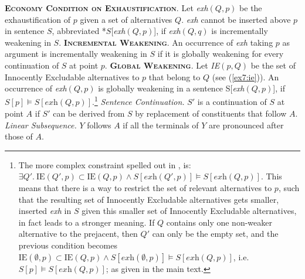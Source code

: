 \begin{exe}
	\ex\label{ex7:economy} {\textsc{\textbf{Economy Condition on Exhaustification}}. Let \textit{exh}$(Q, p)$ be the exhaustification of $p$ given a set of alternatives $Q$. \textit{exh} cannot be inserted above $p$ in sentence $S$, abbreviated *$S$[\textit{exh}$(Q, p)$], if \textit{exh}$(Q, q)$ is incrementally weakening in $S$.}
	\ex\label{ex7:economy-incr-wk} {\textsc{\textbf{Incremental Weakening}}. An occurrence of \textit{exh} taking $p$ as argument is incrementally weakening in $S$ if it is globally weakening for every continuation of $S$ at point $p$.}
	\ex\label{ex7:economy-gl-wk} {\textsc{\textbf{Global Weakening}}. Let \textit{IE}$(p, Q)$ be the set of Innocently Excludable alternatives to $p$ that belong to $Q$ (see (\ref{ex7:ie})). An occurrence of \textit{exh}$(Q, p)$ is globally weakening in a sentence S[\textit{exh}$(Q, p)$], if $S[p] \vDash S[\textit{exh}(Q, p)]$.\footnote{The more complex constraint spelled out in \citet{Fox2018}, is: $\exists Q'. \ \text{IE}(Q', p) \subset \text{IE}(Q, p) \wedge S[\textit{exh}(Q', p)] \vDash S[\textit{exh}(Q, p)]$. This means that there is a way to restrict the set of relevant alternatives to $p$, such that the resulting set of Innocently Excludable alternatives gets smaller, inserted \textit{exh} in $S$ given this smaller set of Innocently Excludable alternatives, in fact leads to a stronger meaning. If $Q$ contains only one non-weaker alternative to the prejacent, then $Q'$ can only be the empty set, and the previous condition becomes $\text{IE}(\emptyset, p) \subset \text{IE}(Q, p) \wedge S[\textit{exh}(\emptyset, p)] \vDash S[\textit{exh}(Q, p)]$, i.e. $S[p] \vDash S[\textit{exh}(Q, p)]$; as given in the main text.}}
	\ex\label{ex7:economy-cont} {\textit{Sentence Continuation.} $S'$ is a continuation of $S$ at point $A$ if $S'$ can be derived from $S$ by replacement of constituents that follow $A$.}
	\ex\label{ex7:economy-prec} {\textit{Linear Subsequence.} $Y$ follows $A$ if all the terminals of $Y$ are pronounced after those of $A$.}
\end{exe}
%
